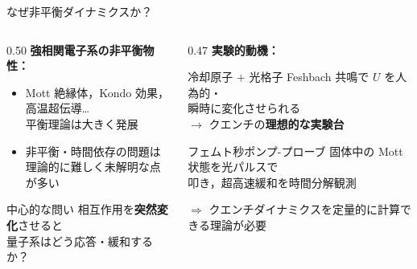 \documentclass[12pt,aspectratio=169]{beamer}
\begin{document}
\begin{frame}{なぜ非平衡ダイナミクスか？}
  \begin{columns}[T]
    \begin{column}{0.50\textwidth}
      \textbf{強相関電子系の非平衡物性：}
      \begin{itemize}
        \item Mott 絶縁体，Kondo 効果，高温超伝導…\\
          \textcolor{myblue}{平衡理論は大きく発展}
        \item 非平衡・時間依存の問題は\\
          \textcolor{myred}{理論的に難しく未解明な点が多い}
      \end{itemize}

      \medskip
      \begin{alertblock}{中心的な問い}
        相互作用を\textbf{突然変化}させると\\
        量子系はどう応答・緩和するか？
      \end{alertblock}
    \end{column}

    \begin{column}{0.47\textwidth}
      \textbf{実験的動機：}
      \begin{block}{冷却原子 $+$ 光格子}
        \small
        Feshbach 共鳴で $U$ を人為的・\\
        瞬時に変化させられる\\
        $\to$ クエンチの\textbf{理想的な実験台}
      \end{block}

      \smallskip
      \begin{block}{フェムト秒ポンプ-プローブ}
        \small
        固体中の Mott 状態を光パルスで\\
        叩き，超高速緩和を時間分解観測
      \end{block}

      \smallskip
      {\small $\Rightarrow$ クエンチダイナミクスを定量的に計算できる理論が必要}
    \end{column}
  \end{columns}
\end{frame}
\end{document}
